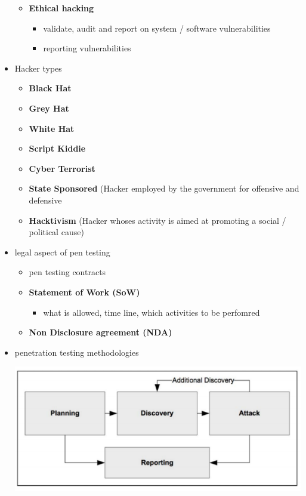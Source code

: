 \documentclass[11pt,twoside,landscape]{article}
\begin{document}
\begin{multicols}{4}
\begin{itemize}
\begin{itemize}
\item \textbf{Ethical hacking}
\begin{itemize}
\item validate, audit and report on system / software vulnerabilities
\item reporting vulnerabilities
\end{itemize}
\end{itemize}

\item Hacker types
\begin{itemize}
\item \textbf{Black Hat}
\item \textbf{Grey Hat}
\item \textbf{White Hat}
\item \textbf{Script Kiddie}
\item \textbf{Cyber Terrorist}
\item \textbf{State Sponsored} (Hacker employed by the government for offensive and defensive
\item \textbf{Hacktivism} (Hacker whoses activity is aimed at promoting a social / political cause)
\end{itemize}

\item legal aspect of pen testing
\begin{itemize}
\item pen testing contracts
\item \textbf{Statement of Work (SoW)}
\begin{itemize}
\item what is allowed, time line, which activities to be perfomred
\end{itemize}
\item \textbf{Non Disclosure agreement (NDA)}
\end{itemize}

\item penetration testing methodologies
\begin{center}
\includegraphics[width=.9\linewidth]{img/penetration_testing_methodologies.png}
\end{center}


\end{itemize}
\end{multicols}
\end{document}
